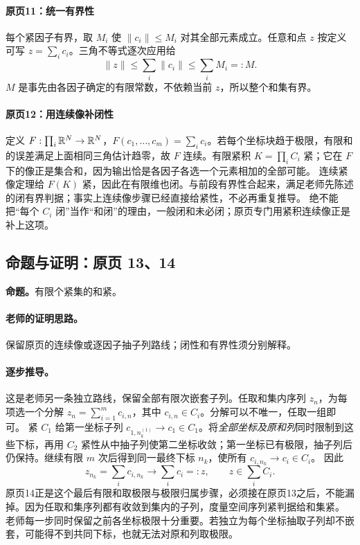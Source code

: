 \paragraph{原页11：统一有界性}
每个紧因子有界，取 $M_i$ 使 $\|c_i\|\le M_i$ 对其全部元素成立。任意和点 $z$ 按定义可写 $z=\sum_i c_i$。三角不等式逐次应用给
\[\|z\|\le\sum_i\|c_i\|\le\sum_iM_i=:M.\]
$M$ 是事先由各因子确定的有限常数，不依赖当前 $z$，所以整个和集有界。
\paragraph{原页12：用连续像补闭性}
定义 $F:\prod_i\mathbb{R}^N\to\mathbb{R}^N$，$F(c_1,\ldots,c_m)=\sum_i c_i$。若每个坐标块趋于极限，有限和的误差满足上面相同三角估计趋零，故 $F$ 连续。有限紧积 $K=\prod_iC_i$ 紧；它在 $F$ 下的像正是集合和，因为输出恰是各因子各选一个元素相加的全部可能。
连续紧像定理给 $F(K)$ 紧，因此在有限维也闭。与前段有界性合起来，满足老师先陈述的闭有界判据；事实上连续像步骤已经直接给紧性，不必再重复推导。
绝不能把“每个 $C_i$ 闭”当作“和闭”的理由，一般闭和未必闭；原页专门用紧积连续像正是补上这项。


\subsection{命题与证明：原页 13、14}

\textbf{命题。}有限个紧集的和紧。

\paragraph{老师的证明思路。}保留原页的连续像或逐因子抽子列路线；闭性和有界性须分别解释。

\paragraph{逐步推导。}
这是老师另一条独立路线，保留全部有限次嵌套子列。任取和集内序列 $z_n$，为每项选一个分解 $z_n=\sum_{i=1}^m c_{i,n}$，其中 $c_{i,n}\in C_i$。分解可以不唯一，任取一组即可。
紧 $C_1$ 给第一坐标子列 $c_{1,n^{(1)}_k}\to c_1\in C_1$。将\emph{全部坐标及原和列}同时限制到这些下标，再用 $C_2$ 紧性从中抽子列使第二坐标收敛；第一坐标已有极限，抽子列后仍保持。继续有限 $m$ 次后得到同一最终下标 $n_k$，使所有 $c_{i,n_k}\to c_i\in C_i$。
因此
\[z_{n_k}=\sum_i c_{i,n_k}\longrightarrow\sum_i c_i=:z,\qquad z\in\sum_i C_i.\]
原页14正是这个最后有限和取极限与极限归属步骤，必须接在原页13之后，不能漏掉。因为任取和集序列都有收敛到集内的子列，度量空间序列紧判据给和集紧。
老师每一步同时保留之前各坐标极限十分重要。若独立为每个坐标抽取子列却不嵌套，可能得不到共同下标，也就无法对原和列取极限。


